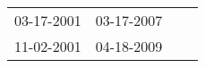 \begin{supertabular}{llll}
 03-17-2001 &  03-17-2007 \\
 11-02-2001 &  04-18-2009 \\
\end{supertabular}
